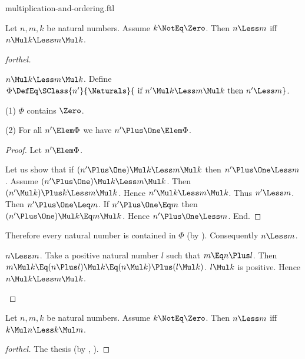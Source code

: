 \documentclass{stex}
\begin{document}
\begin{smodule}{multiplication-and-ordering.ftl}



\begin{proposition*}[forthel,name=preservation of ordering under right-multiplication]
  Let $n, m, k$ be natural numbers.
  Assume $k \NotEq \Zero$.
  Then $n \Less m$ iff $n \Mul k \Less m \Mul k$.
\end{proposition*}
\begin{proof}[forthel]
  \begin{case}{$n \Mul k \Less m \Mul k$.}
    Define $\Phi \DefEq \SClass{n'}{\Naturals}{\text{ if }n' \Mul k \Less m \Mul k\text{ then }n' \Less m}$.

    (1) $\Phi$ contains $\Zero$.

    (2) For all $n' \Elem \Phi$ we have $n' \Plus \One \Elem \Phi$.
    \begin{proof}
      Let $n' \Elem \Phi$.

      Let us show that if $(n' \Plus \One) \Mul k \Less m \Mul k$ then $n' \Plus \One \Less m$.
        Assume $(n' \Plus \One) \Mul k \Less m \Mul k$.
        Then $(n' \Mul k) \Plus k \Less m \Mul k$.
        Hence $n' \Mul k \Less m \Mul k$.
        Thus $n' \Less m$.
        Then $n' \Plus \One \Leq m$.
        If $n' \Plus \One \Eq m$ then $(n' \Plus \One) \Mul k \Eq m \Mul k$.
        Hence $n' \Plus \One \Less m$.
      End.
    \end{proof}

    Therefore every natural number is contained in $\Phi$ (by ).
    Consequently $n \Less m$.
  \end{case}

  \begin{case}{$n \Less m$.}
    Take a positive natural number $l$ such that $m \Eq n \Plus l$.
    Then $m \Mul k \Eq (n \Plus l) \Mul k \Eq (n \Mul k) \Plus (l \Mul k)$.
    $l \Mul k$ is positive.
    Hence $n \Mul k \Less m \Mul k$.
  \end{case}
\end{proof}

\begin{proposition*}[forthel,name=preservation of ordering under left-multiplication]
  Let $n, m, k$ be natural numbers.
  Assume $k \NotEq \Zero$.
  Then $n \Less m$ iff $k \Mul n \Less k \Mul m$.
\end{proposition*}
\begin{proof}[forthel]
  The thesis (by , ).
\end{proof}


\end{smodule}
\end{document}
